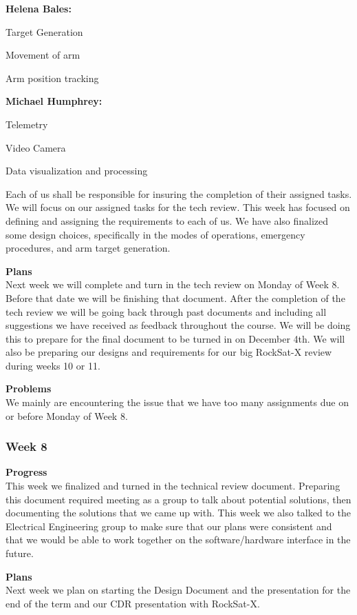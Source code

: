 \textbf{Helena Bales:}

    Target Generation

    Movement of arm

    Arm position tracking

\textbf{Michael Humphrey:}

    Telemetry

    Video Camera

    Data visualization and processing

Each of us shall be responsible for insuring the completion of their assigned tasks. We will focus on our assigned tasks for the tech review. This week has focused on defining and assigning the requirements to each of us. We have also finalized some design choices, specifically in the modes of operations, emergency procedures, and arm target generation.

\textbf{Plans} \\
Next week we will complete and turn in the tech review on Monday of Week 8. Before that date we will be finishing that document. After the completion of the tech review we will be going back through past documents and including all suggestions we have received as feedback throughout the course. We will be doing this to prepare for the final document to be turned in on December 4th. We will also be preparing our designs and requirements for our big RockSat-X review during weeks 10 or 11.

\textbf{Problems} \\
We mainly are encountering the issue that we have too many assignments due on or before Monday of Week 8.

\subsubsection{Week 8}
\textbf{Progress} \\
This week we finalized and turned in the technical review document. Preparing this document required meeting as a group to talk about potential solutions, then documenting the solutions that we came up with. This week we also talked to the Electrical Engineering group to make sure that our plans were consistent and that we would be able to work together on the software/hardware interface in the future.

\textbf{Plans} \\
Next week we plan on starting the Design Document and the presentation for the end of the term and our CDR presentation with RockSat-X.

